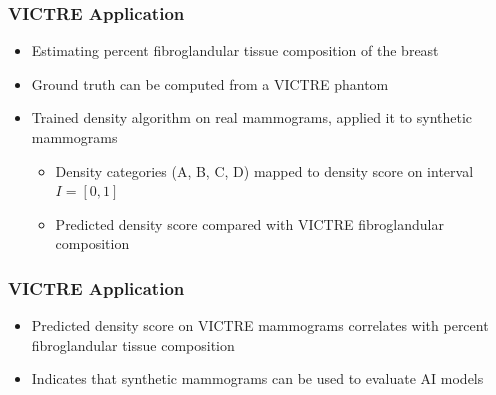 \documentclass[12pt]{beamer}
\begin{document}
\begin{frame}
\frametitle{VICTRE Application}
\begin{itemize}
    \item Estimating percent fibroglandular tissue composition of the breast
    \item Ground truth can be computed from a VICTRE phantom
    \item Trained density algorithm on real mammograms, applied it to synthetic mammograms
    \begin{itemize}
        \item Density categories (A, B, C, D) mapped to density score on interval $I=[0,1]$
        \item Predicted density score compared with VICTRE fibroglandular composition
    \end{itemize}
\end{itemize}
\begin{minipage}[t]{0.5\textwidth}
\begin{figure}[h!]
\centering

\end{figure}
\end{minipage}%
\hfill
\begin{minipage}[t]{0.5\textwidth}
\begin{figure}[h!]
\centering

\end{figure}
\end{minipage}
\end{frame}

\begin{frame}
\frametitle{VICTRE Application}
\begin{itemize}
    \item Predicted density score on VICTRE mammograms correlates with percent fibroglandular tissue composition
    \item Indicates that synthetic mammograms can be used to evaluate AI models
\end{itemize}
\begin{figure}[h!]
\centering

\end{figure}
\end{frame}
\end{document}
